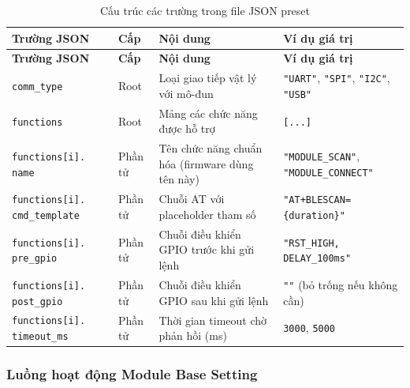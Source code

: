         \begin{longtable}{|p{3.5cm}|p{1.5cm}|p{4.5cm}|p{4cm}|}
            \caption{Cấu trúc các trường trong file JSON preset}
            \label{tab:json_fields} \\
            \hline
            \textbf{Trường JSON} & \textbf{Cấp} & \textbf{Nội dung} & \textbf{Ví dụ giá trị} \\ \hline
            \endfirsthead
            \hline
            \textbf{Trường JSON} & \textbf{Cấp} & \textbf{Nội dung} & \textbf{Ví dụ giá trị} \\ \hline
            \endhead
            \texttt{comm\_type} & Root & Loại giao tiếp vật lý với mô-đun & \texttt{"UART"}, \texttt{"SPI"}, \texttt{"I2C"}, \texttt{"USB"} \\ \hline
            \texttt{functions} & Root & Mảng các chức năng được hỗ trợ & \texttt{[...]} \\ \hline
            \texttt{functions[i].} \newline \texttt{name} & Phần tử & Tên chức năng chuẩn hóa (firmware dùng tên này) & \texttt{"MODULE\_SCAN"}, \texttt{"MODULE\_CONNECT"} \\ \hline
            \texttt{functions[i].} \newline \texttt{cmd\_template} & Phần tử & Chuỗi AT với placeholder tham số & \texttt{"AT+BLESCAN=} \newline \texttt{\{duration\}"} \\ \hline
            \texttt{functions[i].} \newline \texttt{pre\_gpio} & Phần tử & Chuỗi điều khiển GPIO trước khi gửi lệnh & \texttt{"RST\_HIGH,} \newline \texttt{DELAY\_100ms"} \\ \hline
            \texttt{functions[i].} \newline \texttt{post\_gpio} & Phần tử & Chuỗi điều khiển GPIO sau khi gửi lệnh & \texttt{""} (bỏ trống nếu không cần) \\ \hline
            \texttt{functions[i].} \newline \texttt{timeout\_ms} & Phần tử & Thời gian timeout chờ phản hồi (ms) & \texttt{3000}, \texttt{5000} \\ \hline
        \end{longtable}
        
        \subsubsection{Luồng hoạt động Module Base Setting}
        
